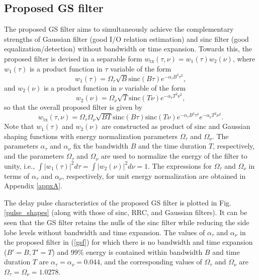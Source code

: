 \vspace{-3mm}
\subsection{Proposed GS filter}
The proposed GS filter aims to simultaneously achieve the complementary strengths of Gaussian filter (good I/O relation estimation) and sinc filter (good equalization/detection) without bandwidth or time expansion. Towards this, the proposed filter is devised in a separable form $w_\text{tx}(\tau,\nu)=w_1(\tau)w_2(\nu)$, where $w_1(\tau)$ is a product function in $\tau$ variable of the form    
\begin{equation}
w_{1}(\tau)=\Omega_{\tau}\sqrt{B}\mathrm{sinc}(B\tau)e^{-\alpha_{\tau}B^{2}\tau^{2}},
\label{delay_domain}
\end{equation}   
and $w_2(\nu)$ is a product function in $\nu$ variable of the form
\begin{equation}
w_{2}(\nu)=\Omega_{\nu}\sqrt{T}\mathrm{sinc}(T\nu)e^{-\alpha_{\nu}T^{2}\nu^{2}},
\label{Doppler_domain}
\end{equation}
so that the overall proposed filter is given by
\begin{equation}
w_\text{tx}(\tau,\nu)=\Omega_\tau\Omega_\nu\sqrt{BT} \mathrm{sinc}(B\tau)\mathrm{sinc}(T\nu)e^{-\alpha_{\tau}B^{2}\tau^{2}} e^{-\alpha_{\nu}T^{2}\nu^{2}}.
\label{gsf}
\end{equation}
Note that $w_1(\tau)$ and $w_2(\nu)$ are constructed as product of sinc and Gaussian shaping functions with energy normalization parameters $\Omega_\tau$ and $\Omega_\nu$. 
The parameters $\alpha_{\tau}$ and $\alpha_{\nu}$ fix the bandwidth $B$ and the time duration $T$, respectively, and 
the parameters $\Omega_{\tau}$ and $\Omega_{\nu}$ are used to normalize the energy of the filter to unity, i.e.,  
$\int |w_1(\tau)|^{2}d\tau =\int |w_{2}(\nu)|^{2} d\nu=1$.
The  expressions for $\Omega_\tau$ and $\Omega_\nu$ in terms of $\alpha_{\tau}$ and
$\alpha_{\nu}$, respectively, for unit energy normalization are obtained in Appendix \ref{appxA}. 

The delay pulse characteristics of the proposed GS filter is plotted in Fig. \ref{pulse_shapes} (along with those of sinc, RRC, and Gaussian filters). It can be seen that the GS filter retains the nulls of the sinc filter while reducing the side lobe levels without bandwidth and time expansion. The values of $\alpha_\tau$ and $\alpha_\nu$ in the proposed filter in (\ref{gsf}) for which there is no bandwidth and time expansion ($B'=B, T'=T$) and 99\% energy is contained within bandwidth $B$ and time duration $T$ are $\alpha_{\tau}=\alpha_{\nu}=0.044$, and the corresponding values of $\Omega_{\tau}$ and $\Omega_{\nu}$ are $\Omega_{\tau}=\Omega_{\nu}=1.0278$. 

